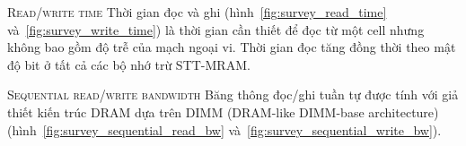 
\textsc{Read/write time} \hspace{0.5cm} Thời gian đọc và ghi
(hình~\ref{fig:survey_read_time} và~\ref{fig:survey_write_time}) là thời gian
cần thiết để đọc từ một cell nhưng không bao gồm độ trễ của mạch ngoại vi. Thời
gian đọc tăng đồng thời theo mật độ bit ở tất cả các bộ nhớ trừ STT-MRAM.


\textsc{Sequential read/write bandwidth} \hspace{0.5cm} Băng thông đọc/ghi tuần
tự được tính với giả thiết kiến trúc DRAM dựa trên DIMM (DRAM-like DIMM-base
architecture) (hình~\ref{fig:survey_sequential_read_bw}
và~\ref{fig:survey_sequential_write_bw}).

